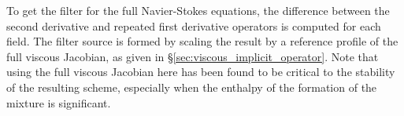 To get the filter for the full Navier-Stokes equations, the difference
between the second derivative and repeated first derivative operators
is computed for each field.  The filter source is formed by scaling
the result by a reference profile of the full viscous Jacobian, as
given in \S\ref{sec:viscous_implicit_operator}.
Note that using the full viscous Jacobian here has been found to be
critical to the stability of the resulting scheme, especially when the
enthalpy of the formation of the mixture is significant.


